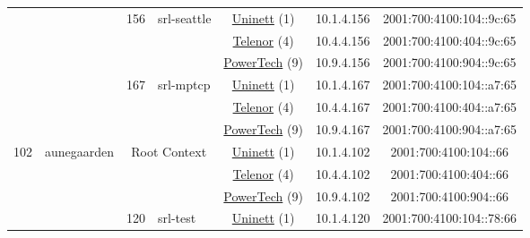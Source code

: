 \begin{small}
\begin{center}
\begin{longtable}{|c|c|c|c|c|c|c|c|}
  &  & \multirow{3}{*}{\tiny{156}} & \multicolumn{1}{|l|}{\multirow{3}{*}{\tiny{srl-seattle}}} & \multicolumn{2}{|c|}{\tiny{\href{https://www.uninett.no}{Uninett} (1)}} & \tiny{10.1.4.156} & \tiny{2001:700:4100:104::9c:65} \\* \cline{5-5}\cline{6-6}\cline{7-7}\cline{8-8}
  &  &  &  & \multicolumn{2}{|c|}{\tiny{\href{https://www.telenor.no}{Telenor} (4)}} & \tiny{10.4.4.156} & \tiny{2001:700:4100:404::9c:65} \\* \cline{5-5}\cline{6-6}\cline{7-7}\cline{8-8}
  &  &  &  & \multicolumn{2}{|c|}{\tiny{\href{http://www.powertech.no}{PowerTech} (9)}} & \tiny{10.9.4.156} & \tiny{2001:700:4100:904::9c:65} \\* \cline{3-3}\cline{4-4}\cline{5-5}\cline{6-6}\cline{7-7}\cline{8-8}
  &  & \multirow{3}{*}{\tiny{167}} & \multicolumn{1}{|l|}{\multirow{3}{*}{\tiny{srl-mptcp}}} & \multicolumn{2}{|c|}{\tiny{\href{https://www.uninett.no}{Uninett} (1)}} & \tiny{10.1.4.167} & \tiny{2001:700:4100:104::a7:65} \\* \cline{5-5}\cline{6-6}\cline{7-7}\cline{8-8}
  &  &  &  & \multicolumn{2}{|c|}{\tiny{\href{https://www.telenor.no}{Telenor} (4)}} & \tiny{10.4.4.167} & \tiny{2001:700:4100:404::a7:65} \\* \cline{5-5}\cline{6-6}\cline{7-7}\cline{8-8}
  &  &  &  & \multicolumn{2}{|c|}{\tiny{\href{http://www.powertech.no}{PowerTech} (9)}} & \tiny{10.9.4.167} & \tiny{2001:700:4100:904::a7:65} \\ \hline
 \multirow{21}{*}{\tiny{102}} & \multicolumn{1}{|l|}{\multirow{21}{*}{\tiny{aunegaarden}}} & \multicolumn{2}{|c|}{\multirow{3}{*}{\tiny{Root Context}}} & \multicolumn{2}{|c|}{\tiny{\href{https://www.uninett.no}{Uninett} (1)}} & \tiny{10.1.4.102} & \tiny{2001:700:4100:104::66} \\* \cline{5-5}\cline{6-6}\cline{7-7}\cline{8-8}
  &  & \multicolumn{2}{|c|}{} & \multicolumn{2}{|c|}{\tiny{\href{https://www.telenor.no}{Telenor} (4)}} & \tiny{10.4.4.102} & \tiny{2001:700:4100:404::66} \\* \cline{5-5}\cline{6-6}\cline{7-7}\cline{8-8}
  &  & \multicolumn{2}{|c|}{} & \multicolumn{2}{|c|}{\tiny{\href{http://www.powertech.no}{PowerTech} (9)}} & \tiny{10.9.4.102} & \tiny{2001:700:4100:904::66} \\* \cline{3-3}\cline{4-4}\cline{5-5}\cline{6-6}\cline{7-7}\cline{8-8}
  &  & \multirow{3}{*}{\tiny{120}} & \multicolumn{1}{|l|}{\multirow{3}{*}{\tiny{srl-test}}} & \multicolumn{2}{|c|}{\tiny{\href{https://www.uninett.no}{Uninett} (1)}} & \tiny{10.1.4.120} & \tiny{2001:700:4100:104::78:66} \\* \cline{5-5}\cline{6-6}\cline{7-7}\cline{8-8}

\end{longtable}
\end{center}
\end{small}
